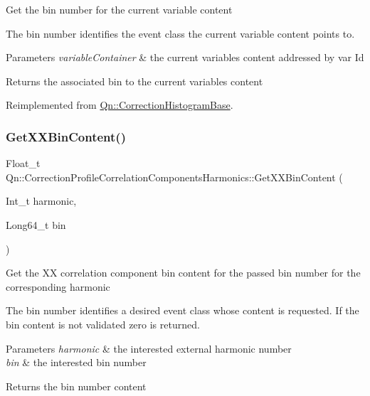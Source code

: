 Get the bin number for the current variable content

The bin number identifies the event class the current variable content points to.


\begin{DoxyParams}{Parameters}
{\em variable\+Container} & the current variables content addressed by var Id \\
\hline
\end{DoxyParams}
\begin{DoxyReturn}{Returns}
the associated bin to the current variables content 
\end{DoxyReturn}


Reimplemented from \mbox{\hyperlink{classQn_1_1CorrectionHistogramBase_ab1f64550f4e1812864da6f9f6ea565e6}{Qn\+::\+Correction\+Histogram\+Base}}.

\mbox{\label{classQn_1_1CorrectionProfileCorrelationComponentsHarmonics_aa48fa859f512dcd7b7e0a7c7ede4bb99}} 
\subsubsection{\texorpdfstring{Get\+X\+X\+Bin\+Content()}{GetXXBinContent()}}
{\footnotesize\ttfamily Float\+\_\+t Qn\+::\+Correction\+Profile\+Correlation\+Components\+Harmonics\+::\+Get\+X\+X\+Bin\+Content (\begin{DoxyParamCaption}\item[{Int\+\_\+t}]{harmonic,  }\item[{Long64\+\_\+t}]{bin }\end{DoxyParamCaption})\hspace{0.3cm}{\ttfamily [virtual]}}

Get the XX correlation component bin content for the passed bin number for the corresponding harmonic

The bin number identifies a desired event class whose content is requested. If the bin content is not validated zero is returned.


\begin{DoxyParams}{Parameters}
{\em harmonic} & the interested external harmonic number \\
\hline
{\em bin} & the interested bin number \\
\hline
\end{DoxyParams}
\begin{DoxyReturn}{Returns}
the bin number content 
\end{DoxyReturn}


